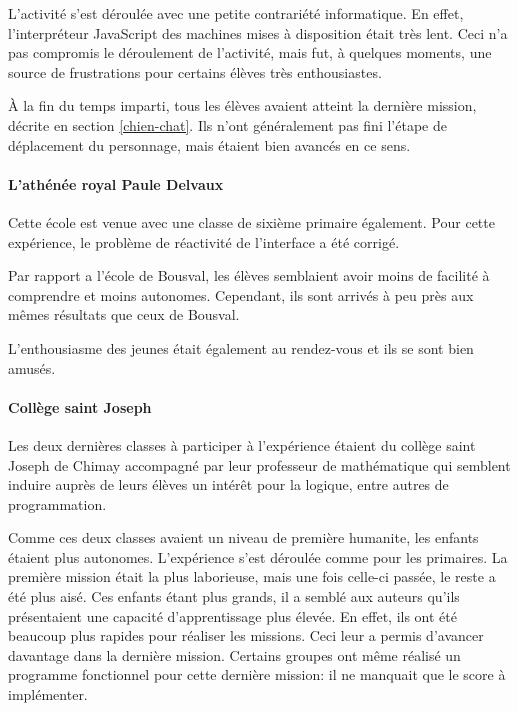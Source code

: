 L'activité s'est déroulée avec une petite contrariété informatique. En effet, l'interpréteur JavaScript des machines mises à disposition était très lent. Ceci n'a pas compromis le déroulement de l'activité, mais fut, à quelques moments, une source de frustrations pour certains élèves très enthousiastes.

À la fin du temps imparti, tous les élèves avaient atteint la dernière \gls{mission}, décrite en section \ref{chien-chat}. Ils n'ont généralement pas fini l'étape de déplacement du personnage, mais étaient bien avancés en ce sens.

\paragraph{L'athénée royal Paule Delvaux}
Cette école est venue avec une classe de sixième \gls{primaire} également. Pour cette expérience, le problème de réactivité de l'interface a été corrigé.

Par rapport a l'école de Bousval, les élèves semblaient avoir moins de facilité à comprendre et moins autonomes.
Cependant, ils sont arrivés à peu près aux mêmes résultats que ceux de Bousval.

L'enthousiasme des jeunes était également au rendez-vous et ils se sont bien amusés.

\paragraph{Collège saint Joseph}
Les deux dernières classes à participer à l'expérience étaient du collège saint Joseph de Chimay accompagné par leur professeur de mathématique qui semblent induire auprès de leurs élèves un intérêt pour la logique, entre autres de programmation.

Comme ces deux classes avaient un niveau de première \gls{humanite}, les enfants étaient plus autonomes. L'expérience s'est déroulée comme pour les \glspl{primaire}. La première \gls{mission} était la plus laborieuse, mais une fois celle-ci passée, le reste a été plus aisé. Ces enfants étant plus grands, il a semblé aux auteurs qu'ils présentaient une capacité d'apprentissage plus élevée. En effet, ils ont été beaucoup plus rapides pour réaliser les \glspl{mission}. Ceci leur a permis d'avancer davantage dans la dernière \gls{mission}. Certains groupes ont même réalisé un programme fonctionnel pour cette dernière \gls{mission}: il ne manquait que le score à implémenter.\\

